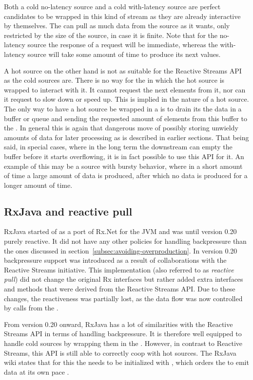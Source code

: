 Both a cold no-latency source and a cold with-latency source are perfect candidates to be wrapped in this kind of stream as they are already interactive by themselves. The  can pull as much data from the source as it wants, only restricted by the size of the source, in case it is finite. Note that for the no-latency source the response of a request will be immediate, whereas the with-latency source will take some amount of time to produce its next  values.

A hot source on the other hand is not as suitable for the Reactive Streams API as the cold sources are. There is no way for the  in which the hot source is wrapped to interact with it. It cannot request the next  elements from it, nor can it request to slow down or speed up. This is implied in the nature of a hot source. The only way to have a hot source be wrapped in a  is to drain its the data in a buffer or queue and sending the requested amount of elements from this buffer to the . In general this is again that dangerous move of possibly storing unwieldy amounts of data for later processing as is described in earlier sections. That being said, in special cases, where in the long term the downstream can empty the buffer before it starts overflowing, it is in fact possible to use this API for it. An example of this may be a source with bursty behavior, where in a short amount of time a large amount of data is produced, after which no data is produced for a longer amount of time.

\subsection{RxJava and reactive pull}
RxJava started of as a port of Rx.Net for the JVM and was until version 0.20 purely reactive. It did not have any other policies for handling backpressure than the ones discussed in section~\ref{subsec:avoiding-overproduction}. In version 0.20 backpressure support was introduced as a result of collaborations with the Reactive Streams initiative. This implementation (also referred to as \textit{reactive pull}) did not change the original Rx interfaces but rather added extra interfaces and methods that were derived from the Reactive Streams API. Due to these changes, the reactiveness was partially lost, as the data flow was now controlled by  calls from the \obv.

From version 0.20 onward, RxJava has a lot of similarities with the Reactive Streams API in terms of handling backpressure. It is therefore well equipped to handle cold sources by wrapping them in the \obs. However, in contrast to Reactive Streams, this API is still able to correctly coop with hot sources. The RxJava wiki states that for this the \obs needs to be initialized with , which orders the \obs to emit data at its own pace \cite{RxJava-Wiki-Backpressure}.


